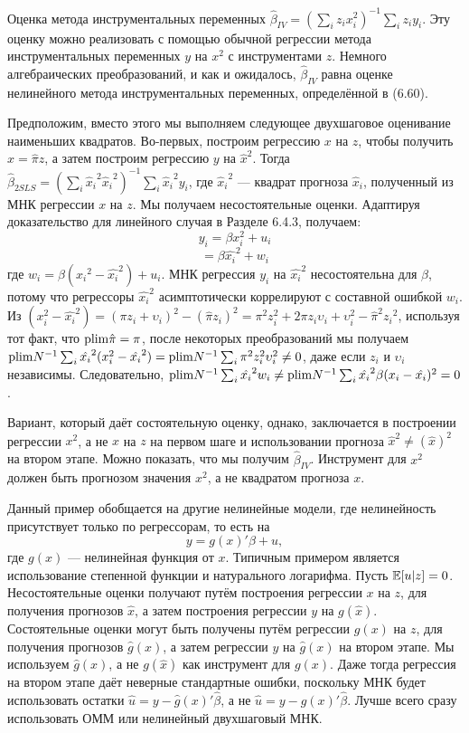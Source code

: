 Оценка метода инструментальных переменных $\hat{\beta}_{IV}= \left( \sum_i z_i x^2_i  \right)^{-1} \sum_i z_i y_i$. Эту оценку можно реализовать с помощью обычной регрессии метода инструментальных переменных $y$ на $x^2$ с инструментами $z$. Немного алгебраических преобразований, и как и ожидалось, $\hat{\beta}_{IV}$ равна оценке нелинейного метода инструментальных переменных, определённой в (6.60).

Предположим, вместо этого мы выполняем следующее двухшаговое оценивание наименьших квадратов. Во-первых, построим регрессию $x$ на $z$, чтобы получить $\hat{x}=\hat{\pi}z$, а затем построим регрессию $y$ на ${\hat{x}}^2$. Тогда $\hat{\beta}_{2SLS}= \left( \sum_i {\hat{x}_i}^2 {\hat{x}_i}^2 \right)^{-1} \sum_i {\hat{x}_i}^2 y_i$, где ${\hat{x}_i}^2$ --- квадрат прогноза $\hat{x}_i$, полученный из МНК регрессии $x$ на $z$. Мы получаем несостоятельные оценки. Адаптируя доказательство для линейного случая в Разделе 6.4.3, получаем:
\[
y_i=\beta x^2_i + u_i
\]
\[
=\beta {\hat{x_i}}^2 + w_i
\]
где $w_i=\beta({x_i}^2-{\hat{x_i}}^2)+u_i$. МНК регрессия $y_i$ на ${\hat{x_i}}^2$ несостоятельна для $\beta$, потому что регрессоры ${\hat{x_i}}^2$ асимптотически коррелируют с составной ошибкой $w_i$. Из $(x^2_i-{\hat{x_i}}^2)=(\pi z_i + \upsilon_i)^2-(\hat{\pi} z_i )^2=\pi^2 z^2_i + 2 \pi z_i \upsilon_i + \upsilon^2_i - {\hat{\pi}}^2{z_i}^2$, используя тот факт, что $\mathrm{plim } \hat{\pi} =\pi$, после некоторых преобразований мы получаем $\mathrm{plim } N^{-1} \sum_i {\hat{x_i}}^2 (x^2_i-{\hat{x_i}}^2) = \mathrm{plim } N^{-1} \sum_i {\pi}^2 z^2_i \upsilon^2_i \not =0$, даже если $z_i$ и $\upsilon_i$ независимы. Следовательно, $\mathrm{plim } N^{-1} \sum_i {\hat{x_i}}^2 w_i \not=  \mathrm{plim } N^{-1} \sum_i {\hat{x_i}}^2 \beta (x_i-\hat{x_i})^2=0$.

Вариант, который даёт состоятельную оценку, однако, заключается в построении регрессии $x^2$, а не $x$ на $z$ на первом шаге и использовании прогноза $\hat{x}^2 \not = (\hat{x})^2$ на втором этапе. Можно показать, что мы получим $\hat{\beta}_{IV}$. Инструмент для $x^2$ должен быть прогнозом значения $x^2$, а не квадратом прогноза $x$.

Данный пример обобщается на другие нелинейные модели, где нелинейность присутствует только по регрессорам, то есть на
\[
y=g(x)' \beta+u,
\]
где $g(x)$ --- нелинейная функция от $x$. Типичным примером является использование степенной функции и натурального  логарифма. Пусть $\mathbb{E}[u|z]=0$. Несостоятельные оценки получают путём построения регрессии $x$ на $z$, для получения прогнозов $\hat{x}$, а затем построения регрессии $y$ на $g(\hat{x})$. Состоятельные оценки могут быть получены путём регрессии $g(x)$ на $z$, для получения прогнозов $\hat{g}(x)$, а затем регрессии $y$ на $\hat{g}(x)$ на втором этапе. Мы используем $\hat{g}(x)$, а не $g(\hat{x})$ как инструмент для $g(x)$. Даже тогда регрессия на втором этапе даёт неверные стандартные ошибки, поскольку МНК будет использовать остатки $\hat{u}=y-\hat{g}(x)'\hat{\beta}$, а не $\hat{u}=y-g(x)'\hat{\beta}$. Лучше всего сразу использовать ОММ или нелинейный двухшаговый МНК.


